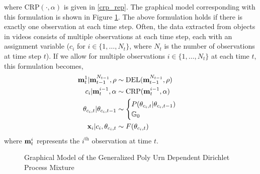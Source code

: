 \documentclass[smallcondensed, final]{svjour3}
\begin{document}
where $\text{CRP}(\cdot, \alpha)$ is given in \eqref{crp_rep}. The graphical model corresponding with this formulation is shown in Figure \ref{fig:gpuddpm_gm_1}. The above formulation holds if there is exactly one observation at each time step. Often, the data extracted from objects in videos consists of multiple observations at each time step, each with an assignment variable ($c_{i}$ for $i \in \{ 1, \ldots, N_{t} \}$, where $N_{t}$ is the number of observations at time step $t$). If we allow for multiple observations $i \in \{ 1, \ldots, N_{t} \}$ at each time $t$, this formulation becomes,
\begin{align}
\begin{split}
\bold{m}_{t}^{1} | \bold{m}_{t-1}^{N_{t-1}}, \rho  &\sim \text{DEL}(\bold{m}_{t-1}^{N_{t-1}}, \rho) \\
c_{i} | \bold{m}_{t}^{i-1}, \alpha  &\sim  \text{CRP}(\bold{m}_{t}^{i-1}, \alpha) \\
\theta_{c_{i}, t} | \theta_{c_{i}, t-1}   &\sim
\begin{cases}
	P(\theta_{c_{i}, t} | \theta_{c_{i}, t-1}) \\
	\mathbb{G}_{0}
\end{cases} \\
\bold{x}_{i} | c_{i}, \theta_{c_{i}, t} &\sim F(\theta_{c_{i}, t})
\end{split}
\end{align}
where $\bold{m}_{t}^{i}$ represents the $i^{\text{th}}$ observation at time $t$. 

\begin{figure}[h]
        \caption{\label{fig:gpuddpm_gm_1} Graphical Model of the Generalized Poly Urn Dependent Dirichlet Process Mixture}
\end{figure}
\end{document}
